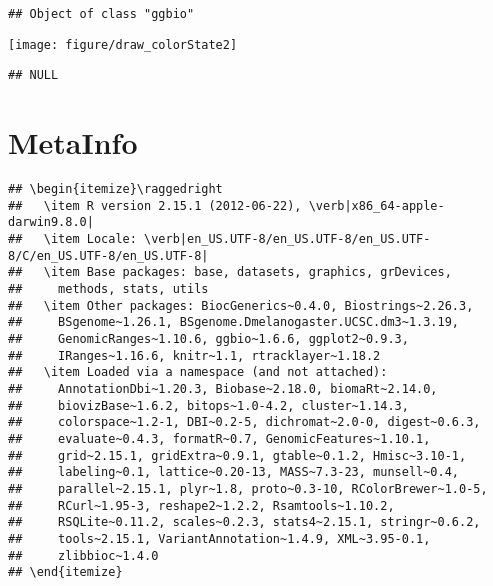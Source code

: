 \documentclass[11pt, oneside]{article}\usepackage{graphicx, color}
\makeatletter
\def\maxwidth{ %
  \ifdim\Gin@nat@width>\linewidth
    \linewidth
  \else
    \Gin@nat@width
  \fi
}
\newenvironment{kframe}{%
 \def\at@end@of@kframe{}%
 \ifinner\ifhmode%
  \def\at@end@of@kframe{\end{minipage}}%
  \begin{minipage}{\columnwidth}%
 \fi\fi%
 \def\FrameCommand##1{\hskip\@totalleftmargin \hskip-\fboxsep
 \colorbox{shadecolor}{##1}\hskip-\fboxsep
     \hskip-\linewidth \hskip-\@totalleftmargin \hskip\columnwidth}%
 \MakeFramed {\advance\hsize-\width
   \@totalleftmargin\z@ \linewidth\hsize
   \@setminipage}}%
 {\par\unskip\endMakeFramed%
 \at@end@of@kframe}
\newenvironment{knitrout}{}{} %
\makeatother
\begin{document}
\begin{knitrout}
\begin{kframe}
{\ttfamily\noindent\itshape\color{messagecolor}{\#\# 'opts' is deprecated. Use 'theme' instead. (Deprecated; last used in version 0.9.1)}}\begin{verbatim}
## Object of class "ggbio"
\end{verbatim}
\end{kframe}
\texttt{[image: figure/draw\_colorState2]} 
\begin{kframe}\begin{verbatim}
## NULL
\end{verbatim}
\end{kframe}
\end{knitrout}


\section{MetaInfo}
\begin{knitrout}
\color{fgcolor}\begin{kframe}
\begin{verbatim}
## \begin{itemize}\raggedright
##   \item R version 2.15.1 (2012-06-22), \verb|x86_64-apple-darwin9.8.0|
##   \item Locale: \verb|en_US.UTF-8/en_US.UTF-8/en_US.UTF-8/C/en_US.UTF-8/en_US.UTF-8|
##   \item Base packages: base, datasets, graphics, grDevices,
##     methods, stats, utils
##   \item Other packages: BiocGenerics~0.4.0, Biostrings~2.26.3,
##     BSgenome~1.26.1, BSgenome.Dmelanogaster.UCSC.dm3~1.3.19,
##     GenomicRanges~1.10.6, ggbio~1.6.6, ggplot2~0.9.3,
##     IRanges~1.16.6, knitr~1.1, rtracklayer~1.18.2
##   \item Loaded via a namespace (and not attached):
##     AnnotationDbi~1.20.3, Biobase~2.18.0, biomaRt~2.14.0,
##     biovizBase~1.6.2, bitops~1.0-4.2, cluster~1.14.3,
##     colorspace~1.2-1, DBI~0.2-5, dichromat~2.0-0, digest~0.6.3,
##     evaluate~0.4.3, formatR~0.7, GenomicFeatures~1.10.1,
##     grid~2.15.1, gridExtra~0.9.1, gtable~0.1.2, Hmisc~3.10-1,
##     labeling~0.1, lattice~0.20-13, MASS~7.3-23, munsell~0.4,
##     parallel~2.15.1, plyr~1.8, proto~0.3-10, RColorBrewer~1.0-5,
##     RCurl~1.95-3, reshape2~1.2.2, Rsamtools~1.10.2,
##     RSQLite~0.11.2, scales~0.2.3, stats4~2.15.1, stringr~0.6.2,
##     tools~2.15.1, VariantAnnotation~1.4.9, XML~3.95-0.1,
##     zlibbioc~1.4.0
## \end{itemize}
\end{verbatim}
\end{kframe}
\end{knitrout}
\end{document}
